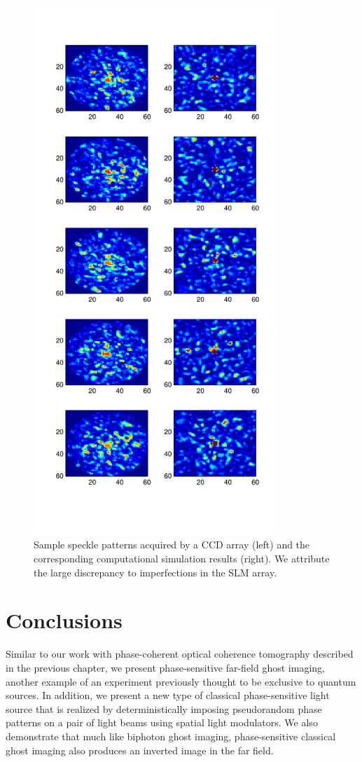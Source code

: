 \begin{figure}[h]
\begin{center}
\includegraphics[height=20cm]{figure-ghost-slm-samples.pdf}
\caption{Sample speckle patterns acquired by a CCD array (left) and the corresponding computational simulation results (right). We attribute the large discrepancy to imperfections in the SLM array.}
\label{figure:ghost-slm-samples}
\end{center}
\end{figure}

\section{Conclusions}

Similar to our work with phase-coherent optical coherence tomography described in the previous chapter, we present phase-sensitive far-field ghost imaging, another example of an experiment previously thought to be exclusive to quantum sources. In addition, we present a new type of classical phase-sensitive light source that is realized by deterministically imposing pseudorandom phase patterns on a pair of light beams using spatial light modulators. We also demonstrate that much like biphoton ghost imaging, phase-sensitive classical ghost imaging also produces an inverted image in the far field.

